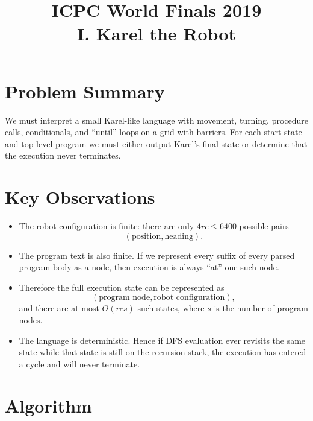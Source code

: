 \documentclass[11pt]{article}
\title{ICPC World Finals 2019\\I. Karel the Robot}
\author{}
\date{}
\begin{document}
\maketitle

\section*{Problem Summary}

We must interpret a small Karel-like language with movement, turning, procedure calls, conditionals, and
``until'' loops on a grid with barriers.
For each start state and top-level program we must either output Karel's final state or determine that the
execution never terminates.

\section*{Key Observations}

\begin{itemize}[leftmargin=*]
    \item The robot configuration is finite: there are only $4rc \le 6400$ possible pairs
    \[
        (\text{position}, \text{heading}).
    \]
    \item The program text is also finite. If we represent every suffix of every parsed program body as a
    node, then execution is always ``at'' one such node.
    \item Therefore the full execution state can be represented as
    \[
        (\text{program node}, \text{robot configuration}),
    \]
    and there are at most $O(rcs)$ such states, where $s$ is the number of program nodes.
    \item The language is deterministic. Hence if DFS evaluation ever revisits the same state while that
    state is still on the recursion stack, the execution has entered a cycle and will never terminate.
\end{itemize}

\section*{Algorithm}
\end{document}

